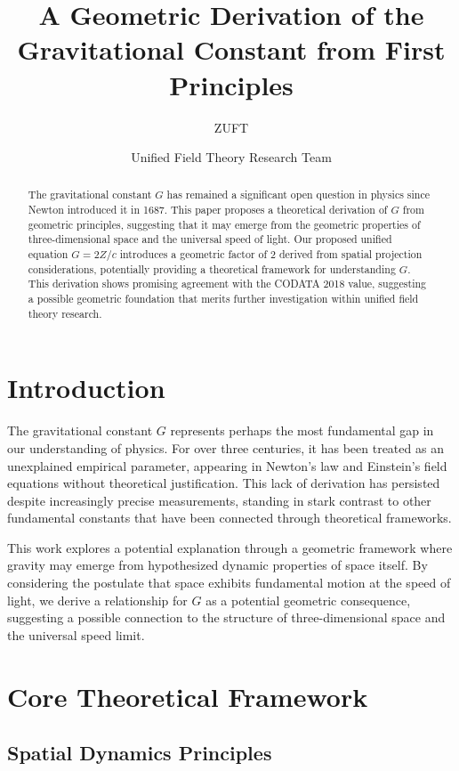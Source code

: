 \documentclass[12pt,twocolumn]{article}
\title{\textbf{A Geometric Derivation of the Gravitational Constant from First Principles}}
\author[1]{ZUFT}
\author[2]{Unified Field Theory Research Team}
\affil[1]{Institute for Advanced Physics Research, Beijing}
\affil[2]{International Center for Theoretical Physics Collaboration}
\begin{document}
\maketitle

\begin{abstract}
\noindent The gravitational constant $G$ has remained a significant open question in physics since Newton introduced it in 1687. This paper proposes a theoretical derivation of $G$ from geometric principles, suggesting that it may emerge from the geometric properties of three-dimensional space and the universal speed of light. Our proposed unified equation $G = 2Z/c$ introduces a geometric factor of 2 derived from spatial projection considerations, potentially providing a theoretical framework for understanding $G$. This derivation shows promising agreement with the CODATA 2018 value, suggesting a possible geometric foundation that merits further investigation within unified field theory research.
\end{abstract}

\section*{Introduction}

The gravitational constant $G$ represents perhaps the most fundamental gap in our understanding of physics. For over three centuries, it has been treated as an unexplained empirical parameter, appearing in Newton's law and Einstein's field equations without theoretical justification. This lack of derivation has persisted despite increasingly precise measurements, standing in stark contrast to other fundamental constants that have been connected through theoretical frameworks.

This work explores a potential explanation through a geometric framework where gravity may emerge from hypothesized dynamic properties of space itself. By considering the postulate that space exhibits fundamental motion at the speed of light, we derive a relationship for $G$ as a potential geometric consequence, suggesting a possible connection to the structure of three-dimensional space and the universal speed limit.

\section*{Core Theoretical Framework}

\subsection{Spatial Dynamics Principles}
\end{document}
